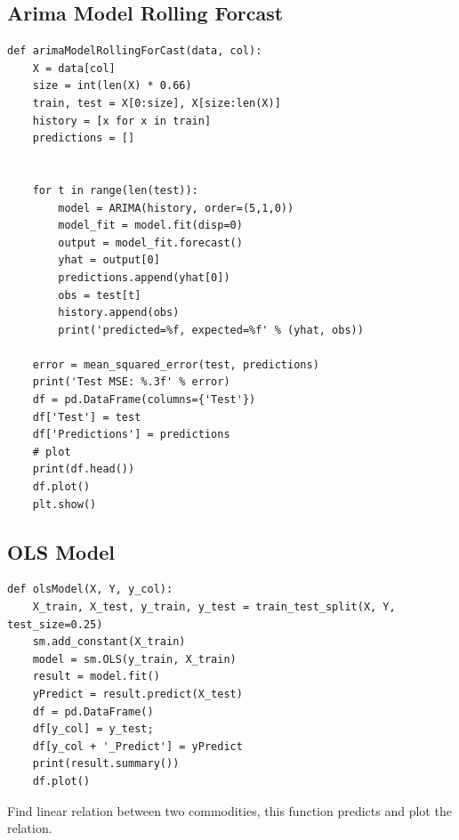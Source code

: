 \documentclass[a4paper,10pt]{article}
\begin{document}
\subsection{Arima Model Rolling Forcast}
\begin{lstlisting}
def arimaModelRollingForCast(data, col):
    X = data[col]
    size = int(len(X) * 0.66)
    train, test = X[0:size], X[size:len(X)]
    history = [x for x in train]
    predictions = []
    
    
    for t in range(len(test)):
        model = ARIMA(history, order=(5,1,0))
        model_fit = model.fit(disp=0)
        output = model_fit.forecast()
        yhat = output[0]
        predictions.append(yhat[0])
        obs = test[t]
        history.append(obs)
        print('predicted=%f, expected=%f' % (yhat, obs))
        
    error = mean_squared_error(test, predictions)
    print('Test MSE: %.3f' % error)
    df = pd.DataFrame(columns={'Test'})
    df['Test'] = test
    df['Predictions'] = predictions 
    # plot
    print(df.head())
    df.plot()
    plt.show()
\end{lstlisting}

\subsection{OLS Model}
\begin{lstlisting}
def olsModel(X, Y, y_col):
    X_train, X_test, y_train, y_test = train_test_split(X, Y, test_size=0.25)
    sm.add_constant(X_train)
    model = sm.OLS(y_train, X_train)
    result = model.fit()
    yPredict = result.predict(X_test)
    df = pd.DataFrame()
    df[y_col] = y_test;
    df[y_col + '_Predict'] = yPredict
    print(result.summary())
    df.plot()
\end{lstlisting}
Find linear relation between two commodities, this function predicts and plot the relation.
\newpage


\end{document}
